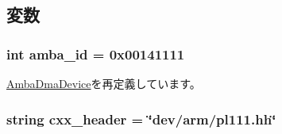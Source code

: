 \subsection{変数}
\hypertarget{classRealView_1_1Pl111_a38d7b9edfe6f0eea7a54e7e4f6253f3a}{
\subsubsection[{amba\_\-id}]{\setlength{\rightskip}{0pt plus 5cm}int {\bf amba\_\-id} = 0x00141111}}
\label{classRealView_1_1Pl111_a38d7b9edfe6f0eea7a54e7e4f6253f3a}


\hyperlink{classRealView_1_1AmbaDmaDevice_ad9d2b9e37de5c1c7c10219fc1b834599}{AmbaDmaDevice}を再定義しています。\hypertarget{classRealView_1_1Pl111_a17da7064bc5c518791f0c891eff05fda}{
\subsubsection[{cxx\_\-header}]{\setlength{\rightskip}{0pt plus 5cm}string {\bf cxx\_\-header} = \char`\"{}dev/arm/pl111.hh\char`\"{}}}
\label{classRealView_1_1Pl111_a17da7064bc5c518791f0c891eff05fda}


